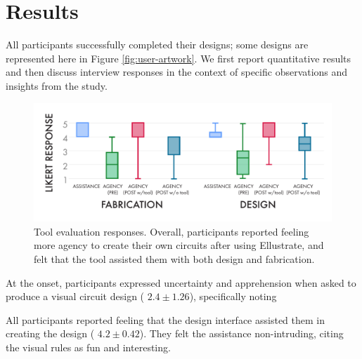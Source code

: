 \documentclass{sigchi}
\begin{document}
\section{Results}
All participants successfully completed their designs; some designs are represented here in Figure \ref{fig:user-artwork}. 
We first report quantitative results and then discuss interview responses in the context of specific observations and insights from the study.

\begin{figure}[t]
\centering
\includegraphics[width=1.0\columnwidth]{charts/boxplots_quant.pdf}
\caption{Tool evaluation responses. Overall, participants reported feeling more agency to create their own circuits after using Ellustrate, and felt that the tool assisted them with both design and fabrication.}
\label{fig:fab_tool_results}
\vspace{-20pt}
\end{figure}

  At the onset, participants expressed uncertainty and apprehension when asked to produce a visual circuit design ( $2.4 \pm 1.26$), specifically noting 
  
  All participants reported feeling that the design interface assisted them in creating the design ( $4.2 \pm 0.42$). They felt the assistance non-intruding, citing the visual rules as fun and interesting. 
\end{document}
